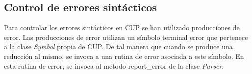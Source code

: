\subsection{Control de errores sintácticos}

Para controlar los errores sintácticos en CUP se han utilizado producciones de error. Las producciones de error utilizan un símbolo terminal error que pertenece a la clase \textit{Symbol} propia de CUP.\newline\newline
De tal manera que cuando se produce una reducción al mismo, se invoca a una rutina de error asociada a este símbolo. En esta rutina de error, se invoca al método report\_error de la clase \textit{Parser}.
\clearpage

